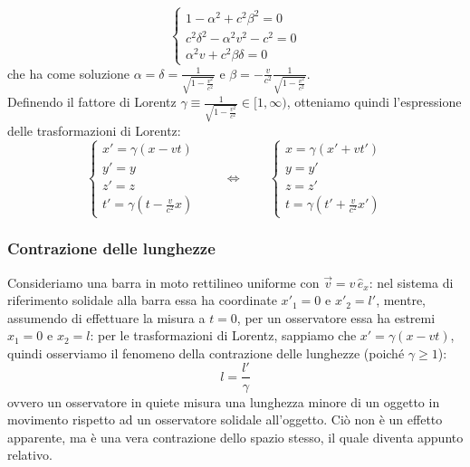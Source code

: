 \begin{equation}
	\begin{cases}
		1 - \alpha^2 + c^2 \beta^2 = 0 \\ 
		c^2 \delta^2 - \alpha^2 v^2 - c^2 = 0 \\ 
		\alpha^2 v + c^2 \beta\delta = 0
	\end{cases}
	\label{eq:5}
\end{equation}
che ha come soluzione $ \alpha = \delta = \frac{1}{\sqrt{1 - \frac{v^2}{c^2}}} $ e $ \beta = -\frac{v}{c^2}\frac{1}{\sqrt{1 - \frac{v^2}{c^2}}} $. \\ 
%
Definendo il fattore di Lorentz $ \gamma \equiv \frac{1}{\sqrt{1 - \frac{v^2}{c^2}}} \in [1, \infty)$, otteniamo quindi l'espressione delle trasformazioni di Lorentz:
\begin{equation}
	\begin{cases}
		x' = \gamma \left(x - vt\right) \\ 
		y' = y \\ 
		z' = z \\ 
		t' = \gamma \left(t - \frac{v}{c^2} x\right)
	\end{cases}
	\qquad\Longleftrightarrow\qquad
		\begin{cases}
		x = \gamma \left(x' + vt'\right) \\ 
		y = y' \\ 
		z = z' \\ 
		t = \gamma \left(t' + \frac{v}{c^2} x'\right)
	\end{cases}
	\label{eq:6}
\end{equation}

\subsubsection{Contrazione delle lunghezze}

Consideriamo una barra in moto rettilineo uniforme con $ \vec{v} = v\,\hat{e}_x $: nel sistema di riferimento solidale alla barra essa ha coordinate $ x'_1 = 0 $ e $ x'_2 = l' $, mentre, assumendo di effettuare la misura a $ t = 0 $, per un osservatore essa ha estremi $ x_1 = 0 $ e $ x_2 = l $: per le trasformazioni di Lorentz, sappiamo che $ x' = \gamma (x - vt) $, quindi osserviamo il fenomeno della contrazione delle lunghezze (poiché $ \gamma \ge 1 $):
\begin{equation}
	l = \frac{l'}{\gamma}
	\label{eq:7}
\end{equation}
ovvero un osservatore in quiete misura una lunghezza minore di un oggetto in movimento rispetto ad un osservatore solidale all'oggetto. Ciò non è un effetto apparente, ma è una vera contrazione dello spazio stesso, il quale diventa appunto relativo.

